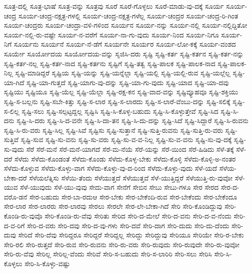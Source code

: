 {ಸೂತ್ರ-ದಲ್ಲಿ
ಸೂತ್ರ-ಭಾಷೆ
ಸೂತ್ರ-ವನ್ನು
ಸೂತ್ರವು
ಸೂರೆ
ಸೂರೆ-ಗೊಳ್ಳಲು
ಸೂರೆ-ಮಾಡು-ವು-ದಕ್ಕೆ
ಸೂರ್ಯ
ಸೂರ್ಯ-ಚಂದ್ರ
ಸೂರ್ಯ-ಚಂದ್ರ-ನಕ್ಷತ್ರ-ಗಳಲ್ಲಿ
ಸೂರ್ಯ-ಚಂದ್ರ-ನಕ್ಷತ್ರ-ಗಳೆಲ್ಲ
ಸೂರ್ಯ-ಚಂದ್ರರ
ಸೂರ್ಯ-ಚಂದ್ರ-ರಿ-ಗಿಂತ
ಸೂರ್ಯ-ಚಂದ್ರರು
ಸೂರ್ಯ-ಚಂದ್ರಾ-ವಳಿ-ಗಳಿಂದ
ಸೂರ್ಯನ
ಸೂರ್ಯ-ನನ್ನು
ಸೂರ್ಯ-ನಲ್ಲಿ
ಸೂರ್ಯ-ನಲ್ಲಿದ್ದಿತೋ
ಸೂರ್ಯ-ನಲ್ಲಿ-ರು-ವಷ್ಟೇ
ಸೂರ್ಯ-ನ-ವರೆಗೆ
ಸೂರ್ಯ-ನಾ-ಗು-ವುದು
ಸೂರ್ಯ-ನಿಂದ
ಸೂರ್ಯ-ನಿಗೂ
ಸೂರ್ಯ-ನಿಗೆ
ಸೂರ್ಯನು
ಸೂರ್ಯನೆ
ಸೂರ್ಯ-ನೆ-ಡೆಗೆ
ಸೂರ್ಯನೇ
ಸೂರ್ಯರ
ಸೂರ್ಯ-ಲೋ-ಕಕ್ಕೆ
ಸೂರ್ಯ-ವಂಶದ
ಸೂರ್ಯೇ
ಸೂರ್ಯೋದಯ
ಸೂರ್ಯೋದಯ-ವನ್ನು
ಸೃಜಿಸಿ-ದರು
ಸೃಷ್ಟಿ
ಸೃಷ್ಟಿ-ಕರ್ತ
ಸೃಷ್ಟಿ-ಕರ್ತನ
ಸೃಷ್ಟಿ-ಕರ್ತ-ನನ್ನು
ಸೃಷ್ಟಿ-ಕರ್ತ-ನಲ್ಲ
ಸೃಷ್ಟಿ-ಕರ್ತ-ನಾದ
ಸೃಷ್ಟಿ-ಕರ್ತನು
ಸೃಷ್ಟಿಗೆ
ಸೃಷ್ಟಿ-ತತ್ವ
ಸೃಷ್ಟಿ-ಪಾಲಕ
ಸೃಷ್ಟಿ-ಪಾಲಕ-ನಾದ
ಸೃಷ್ಟಿ-ಪಾಲಕ-ನಿಲ್ಲ
ಸೃಷ್ಟಿ-ಮಾಡಿದ್ದರೆ
ಸೃಷ್ಟಿಯ
ಸೃಷ್ಟಿ-ಯನ್ನು
ಸೃಷ್ಟಿ-ಯನ್ನೆಲ್ಲಾ
ಸೃಷ್ಟಿ-ಯಲ್ಲಿ
ಸೃಷ್ಟಿ-ಯಲ್ಲಿ-ರುವ
ಸೃಷ್ಟಿ-ಯಲ್ಲೆಲ್ಲ
ಸೃಷ್ಟಿ-ಯಾ-ಗಿದೆ
ಸೃಷ್ಟಿ-ಯಾ-ಗುತ್ತದೆ
ಸೃಷ್ಟಿ-ಯಾಗು-ವು-ದನ್ನು
ಸೃಷ್ಟಿ-ಯಾ-ಗು-ವುದು
ಸೃಷ್ಟಿ-ಯಾದ
ಸೃಷ್ಟಿ-ಯಾ-ದವು
ಸೃಷ್ಟಿಯು
ಸೃಷ್ಟಿಯೂ
ಸೃಷ್ಟಿ-ಯೆಲ್ಲ
ಸೃಷ್ಟಿ-ಯೆಲ್ಲಾ
ಸೃಷ್ಟಿ-ರಕ್ಷ-ಕನ
ಸೃಷ್ಟಿ-ವಾದ-ವನ್ನು
ಸೃಷ್ಟಿವ್ಯೂಹವೂ
ಸೃಷ್ಟಿ-ಶಕ್ತಿಯು
ಸೃಷ್ಟಿ-ಸ-ಬಲ್ಲನು
ಸೃಷ್ಟಿ-ಸಬೇ-ಕಿತ್ತು
ಸೃಷ್ಟಿ-ಸ-ಲಾರ
ಸೃಷ್ಟಿ-ಸ-ಲಾರದು
ಸೃಷ್ಟಿ-ಸ-ಲಾರೆ-ವೆಂಬು-ದನ್ನು
ಸೃಷ್ಟಿ-ಸಲಿಕ್ಕೆ
ಸೃಷ್ಟಿ-ಸ-ಲಿಲ್ಲ
ಸೃಷ್ಟಿ-ಸಲು
ಸೃಷ್ಟಿ-ಸಲ್ಪಟ್ಟದ್ದಲ್ಲ
ಸೃಷ್ಟಿಸಿ
ಸೃಷ್ಟಿ-ಸಿ-ಕೊಳ್ಳ-ಬಹುದು
ಸೃಷ್ಟಿ-ಸಿ-ಕೊಳ್ಳುತ್ತೇವೆ
ಸೃಷ್ಟಿ-ಸಿದ
ಸೃಷ್ಟಿ-ಸಿ-ದನು
ಸೃಷ್ಟಿ-ಸಿ-ದರು
ಸೃಷ್ಟಿ-ಸಿ-ದ-ವನೇ
ಸೃಷ್ಟಿ-ಸಿ-ದಾ-ತನ
ಸೃಷ್ಟಿ-ಸಿ-ದು-ದನ್ನು
ಸೃಷ್ಟಿ-ಸಿದೆ
ಸೃಷ್ಟಿ-ಸಿದ್ದಾರೆ
ಸೃಷ್ಟಿ-ಸಿ-ರುವನು
ಸೃಷ್ಟಿ-ಸಿ-ರು-ವರು
ಸೃಷ್ಟಿ-ಸಿಲ್ಲ
ಸೃಷ್ಟಿ-ಸಿವೆ
ಸೃಷ್ಟಿಸು
ಸೃಷ್ಟಿ-ಸುತ್ತಾನೆ
ಸೃಷ್ಟಿ-ಸುತ್ತಿ-ರುವನು
ಸೃಷ್ಟಿ-ಸುತ್ತಿ-ರು-ವರು
ಸೃಷ್ಟಿ-ಸುತ್ತಿವೆ
ಸೃಷ್ಟಿ-ಸುವ
ಸೃಷ್ಟಿ-ಸು-ವನು
ಸೃಷ್ಟಿ-ಸು-ವರು
ಸೃಷ್ಟಿ-ಸು-ವ-ವ-ನಿಲ್ಲ
ಸೃಷ್ಟಿ-ಸು-ವ-ವನು
ಸೃಷ್ಟಿ-ಸು-ವು-ದಕ್ಕೆ
ಸೃಷ್ಟಿ-ಸು-ವುದು
ಸೆರೆ
ಸೆರೆ-ಮನೆ
ಸೆರೆ-ಮನೆ-ಯಾಗದೆ
ಸೆರೆ-ಮ-ನೆಯೆ
ಸೆರೆ-ಯನ್ನು
ಸೆರೆ-ಯಿಂದ
ಸೆರೆ-ಹಿಡಿದು
ಸೆಳೆ-ತಕ್ಕೆ
ಸೆಳೆ-ದರೆ
ಸೆಳೆದು
ಸೆಳೆದು-ಕೊಂಡಂತೆ
ಸೆಳೆದು-ಕೊಂಡು
ಸೆಳೆದು-ಕೊಳ್ಳ-ಬೇಕು
ಸೆಳೆದು-ಕೊಳ್ಳಿ
ಸೆಳೆದು-ಕೊಳ್ಳಿ-ಅ-ನಂತರ
ಸೆಳೆದು-ಕೊಳ್ಳುವ
ಸೆಳೆದು-ಕೊಳ್ಳು-ವಾಗ
ಸೆಳೆದು-ಕೊಳ್ಳು-ವು-ದ-ರಿಂದ
ಸೆಳೆದು-ಕೊಳ್ಳು-ವುದು
ಸೆಳೆ-ಯದೆ
ಸೆಳೆಯ-ಬೇಕಾ-ದರೆ
ಸೆಳೆಯಲೆತ್ನಿಸು
ಸೆಳೆಯಿ-ತೆಂದು
ಸೆಳೆಯುತ್ತದೆ
ಸೆಳೆಯುತ್ತವೆ
ಸೆಳೆ-ಯುತ್ತಿದ್ದರೆ
ಸೆಳೆಯುತ್ತಿ-ರು-ವುವೋ
ಸೆಳೆ-ಯುವ
ಸೆಳೆ-ಯುವುದು
ಸೆಳೆ-ಯು-ವುವು
ಸೇದು-ವಾಗ
ಸೇನೆಗೆ
ಸೇಬಿನ
ಸೇಬು
ಸೇಬು-ಗಳೂ
ಸೇರ
ಸೇರದ
ಸೇರ-ದ-ವರೊ-ಡನೆ
ಸೇರ-ಬಹುದು
ಸೇರ-ಬಾ-ರದುಆ
ಸೇರ-ಬೇಕು
ಸೇರ-ಬೇಕೆಂದಿ-ರುವ
ಸೇರ-ಬೇಕೆಂದು
ಸೇರ-ಬೇಕೆಂದೂ
ಸೇರ-ಲಾರ
ಸೇರ-ಲಾರರು
ಸೇರ-ಲಾರವು
ಸೇರಲು
ಸೇರಲೇ
ಸೇರ-ಲೇ-ಬೇಕಾ-ಗಿದೆ
ಸೇರಿ
ಸೇರಿ-ಕೊಂಡಿದ್ದುವು
ಸೇರಿ-ಕೊಂಡಿ-ರು-ವುವೊ
ಸೇರಿ-ಕೊಂಡಿ-ರು-ವೆವು
ಸೇರಿತು
ಸೇರಿದ
ಸೇರಿ-ದ-ಮೇಲೆ
ಸೇರಿ-ದ-ವನು
ಸೇರಿ-ದ-ವ-ನೆಂದು
ಸೇರಿ-ದ-ವ-ರಿಗೆ
ಸೇರಿ-ದ-ವರು
ಸೇರಿ-ದವು
ಸೇರಿ-ದ-ವು-ಗಳು
ಸೇರಿ-ದವೆ
ಸೇರಿ-ದಾಗ
ಸೇರಿ-ದುದು
ಸೇರಿ-ದು-ದೆಂದು
ಸೇರಿ-ದುವು
ಸೇರಿದೆ
ಸೇರಿ-ದೆವು
ಸೇರಿದ್ದರೂ
ಸೇರಿದ್ದರೆ
ಸೇರಿದ್ದಲ್ಲ
ಸೇರಿದ್ದು
ಸೇರಿದ್ದುವು
ಸೇರಿಯೂ
ಸೇರಿಯೇ
ಸೇರಿ-ರ-ಬೇಕು
ಸೇರಿ-ರಲಿ
ಸೇರಿ-ರುತ್ತದೆ
ಸೇರಿ-ರುವ
ಸೇರಿ-ರುವನು
ಸೇರಿ-ರು-ವರು
ಸೇರಿ-ರುವುದು
ಸೇರಿ-ರುವುದೇ
ಸೇರಿ-ರು-ವುವೋ
ಸೇರಿ-ರು-ವೆವು
ಸೇರಿಲ್ಲ
ಸೇರಿಲ್ಲ-ವೆಂದು
ಸೇರಿವೆ
ಸೇರಿ-ಸ-ಬಹುದು
ಸೇರಿ-ಸ-ಲಾರಿರಿ
ಸೇರಿ-ಸಲು
ಸೇರಿಸಿ
ಸೇರಿ-ಸಿ-ಕೊಳ್ಳಲು
ಸೇರಿ-ಸಿ-ಕೊಳ್ಳು-ವಷ್ಟು
}
